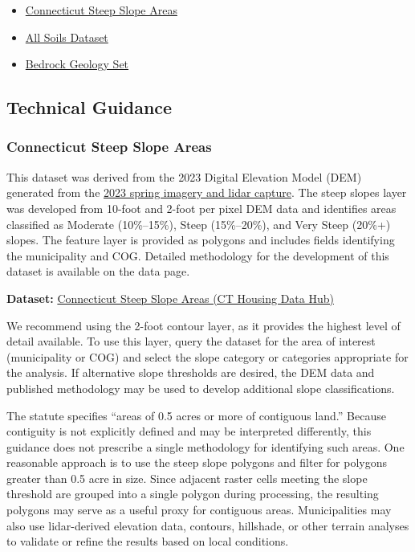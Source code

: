 \documentclass[
  letterpaper,
  DIV=11,
  numbers=noendperiod]{scrreprt}
\providecommand{\tightlist}{%
  \setlength{\itemsep}{0pt}\setlength{\parskip}{0pt}}
\begin{document}
\begin{itemize}
\tightlist
\item
  \hyperref[sec-connecticut-steep-slope-areas]{Connecticut Steep Slope
  Areas}
\item
  \hyperref[sec-all-soils]{All Soils Dataset}
\item
  \hyperref[sec-bedrock-geology-set]{Bedrock Geology Set}
\end{itemize}

\subsection{Technical Guidance}\label{technical-guidance-3}

\subsubsection{Connecticut Steep Slope
Areas}\label{sec-connecticut-steep-slope-areas}

This dataset was derived from the 2023 Digital Elevation Model (DEM)
generated from the
\href{https://maps.cteco.uconn.edu/data/flight2023/}{2023 spring imagery
and lidar capture}. The steep slopes layer was developed from 10-foot
and 2-foot per pixel DEM data and identifies areas classified as
Moderate (10\%--15\%), Steep (15\%--20\%), and Very Steep (20\%+)
slopes. The feature layer is provided as polygons and includes fields
identifying the municipality and COG. Detailed methodology for the
development of this dataset is available on the data page.

\textbf{Dataset:}
\href{https://housingmaps.ct.gov/maps/64e698b122464435a56172f576f3d2a6/about}{Connecticut
Steep Slope Areas (CT Housing Data Hub)}

We recommend using the 2-foot contour layer, as it provides the highest
level of detail available. To use this layer, query the dataset for the
area of interest (municipality or COG) and select the slope category or
categories appropriate for the analysis. If alternative slope thresholds
are desired, the DEM data and published methodology may be used to
develop additional slope classifications.

The statute specifies ``areas of 0.5 acres or more of contiguous land.''
Because contiguity is not explicitly defined and may be interpreted
differently, this guidance does not prescribe a single methodology for
identifying such areas. One reasonable approach is to use the steep
slope polygons and filter for polygons greater than 0.5 acre in size.
Since adjacent raster cells meeting the slope threshold are grouped into
a single polygon during processing, the resulting polygons may serve as
a useful proxy for contiguous areas. Municipalities may also use
lidar-derived elevation data, contours, hillshade, or other terrain
analyses to validate or refine the results based on local conditions.
\end{document}
